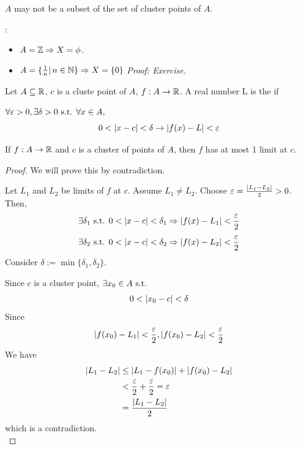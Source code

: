\documentclass[a4paper,12pt]{article}
\begin{document}
\begin{theorem}
    \begin{remark}
        \(A\) may not be a subset of the set of cluster points of \(A\).
        \begin{example}:
            \begin{itemize}
                \item \(A=\mathbb{Z}\Rightarrow X=\phi\).
                \item \(A=\{\frac{1}{n }|\,n\in\mathbb{N} \}\Rightarrow X=\{0\}\) \textit{Proof: Exercise.}\\
            \end{itemize}
        \end{example}
    \end{remark}
\end{theorem}

\begin{definition}
    Let \(A\subseteq\mathbb{R}\), \(c\) is a cluste point of \(A\), \(f:A\rightarrow\mathbb{R}\). A real number L is the  if 

    \(\forall \varepsilon>0, \exists\delta>0 \text{ s.t. } \forall x\in A,\)
    \[0<\left\lvert x-c \right\rvert<\delta \rightarrow \left\lvert f(x)-L\right\rvert<\varepsilon\]
\end{definition}

\begin{theorem}
    If \(f:A\rightarrow \mathbb{R}\) and \(c \) is a cluster of points of \(A \), then \(f \) has at most 1 limit at \(c \).
    \begin{proof}
        We will prove this by contradiction.

        Let \(L_1\) and \(L_2\) be limits of \(f \) at \(c \). Assume \(L_1\neq L_2 \). Choose \(\varepsilon=\frac{\left\lvert L_1-L_2\right\rvert}{2}>0\). Then,
        \[\exists \delta_1\text{ s.t. } 0<\left\lvert x-c\right\rvert<\delta_1\Rightarrow\left\lvert f(x)-L_1\right\rvert<\frac{\varepsilon}{2}\]
        \[\exists \delta_2\text{ s.t. } 0<\left\lvert x-c\right\rvert<\delta_2\Rightarrow\left\lvert f(x)-L_2\right\rvert<\frac{\varepsilon}{2}\]
        Consider \(\delta:=\min\{\delta_1,\delta_2\}\). 

        Since \(c\) is a cluster point, \(\exists x_0\in A\text{ s.t. }\) 
        \[0<\left\lvert x_0-c\right\rvert<\delta\]
        Since \[\left\lvert f(x_0)-L_1\right\rvert<\frac{\varepsilon}{2},\left\lvert f(x_0)-L_2\right\rvert<\frac{\varepsilon}{2}\]
        We have 
        \begin{align*}
            \left\lvert L_1-L_2\right\rvert&\le \left\lvert L_1-f(x_0)\right\rvert+\left\lvert f(x_0)-L_2\right\rvert\\
            &<\frac{\varepsilon}{2}+\frac{\varepsilon}{2}=\varepsilon\\
            &=\frac{\left\lvert L_1-L_2\right\rvert}{2}
        \end{align*}
        which is a contradiction.\\
    \end{proof}
\end{theorem}
\end{document}
